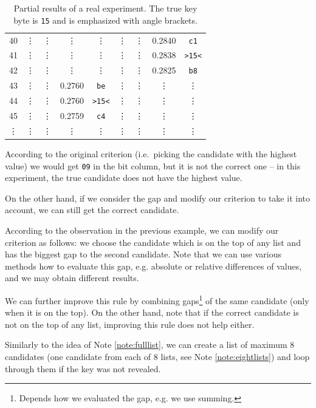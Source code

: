 \begin{example}
\begin{table}[H]
\begin{center}
\begin{tabular}{| c | c | c | c | c | c | c | c | c |}
					40     & \vdots & \vdots     & \vdots & \vdots     & \vdots & \vdots     & 0.2840 & {\tt c1}   \\
					41     & \vdots & \vdots     & \vdots & \vdots     & \vdots & \vdots     & 0.2838 & {\tt >15<} \\
					42     & \vdots & \vdots     & \vdots & \vdots     & \vdots & \vdots     & 0.2825 & {\tt b8}   \\
					43     & \vdots & \vdots     & 0.2760 & {\tt be}   & \vdots & \vdots     & \vdots & \vdots     \\
					44     & \vdots & \vdots     & 0.2760 & {\tt >15<} & \vdots & \vdots     & \vdots & \vdots     \\
					45     & \vdots & \vdots     & 0.2759 & {\tt c4}   & \vdots & \vdots     & \vdots & \vdots     \\
					\vdots & \vdots & \vdots     & \vdots & \vdots     & \vdots & \vdots     & \vdots & \vdots     \\
				\hline
			\end{tabular}
			\end{center}
		\caption{Partial results of a real experiment. The true key byte is {\tt 15} and is emphasized with angle brackets.}
		\label{tab:gap}
		\end{table}
		According to the original criterion (i.e.\ picking the candidate with the highest value) we would get {\tt 09} in the  bit column, but it is not the correct one -- in this experiment, the true candidate does not have the highest value.
		
		On the other hand, if we consider the gap and modify our criterion to take it into account, we can still get the correct candidate.
	\end{example}
	
	\begin{remark}
	\label{rem:gap}
		According to the observation in the previous example, we can modify our criterion as follows: we choose the candidate which is on the top of any list and has the biggest gap to the second candidate. Note that we can use various methods how to evaluate this gap, e.g. absolute or relative differences of values, and we may obtain different results.
		
		We can further improve this rule by combining gaps\footnote{Depends how we evaluated the gap, e.g. we use summing.} of the same candidate (only when it is on the top). On the other hand, note that if the correct candidate is not on the top of any list, improving this rule does not help either.
		
		Similarly to the idea of Note \ref{note:fulllist}, we can create a list of maximum $8$ candidates (one candidate from each of $8$ lists, see Note \ref{note:eightlists}) and loop through them if the key was not revealed.
	\end{remark}
	
